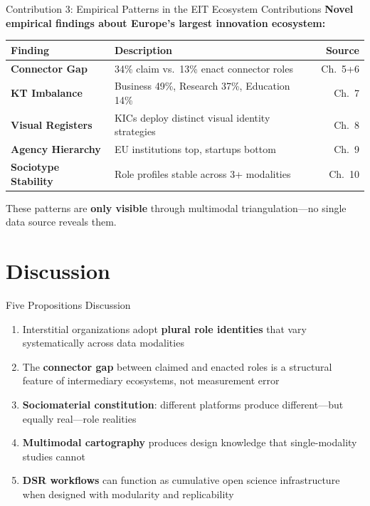 \documentclass[aspectratio=169]{beamer}
\newcommand{\secmark}[1]{\hfill{\scriptsize\color{gray}#1}}
\begin{document}
\begin{frame}{Contribution 3: Empirical Patterns in the EIT Ecosystem}
\secmark{Contributions}
\textbf{Novel empirical findings about Europe's largest innovation ecosystem:}
\vspace{0.5em}
\renewcommand{\arraystretch}{1.3}
\begin{tabularx}{\textwidth}{@{}>{\bfseries}l X >{\small}r@{}}
\toprule
\textbf{Finding} & \textbf{Description} & \textbf{Source} \\
\midrule
Connector Gap  & 34\% claim vs.\ 13\% enact connector roles & Ch.~5+6 \\
KT Imbalance   & Business 49\%, Research 37\%, Education 14\% & Ch.~7 \\
Visual Registers & KICs deploy distinct visual identity strategies & Ch.~8 \\
Agency Hierarchy & EU institutions top, startups bottom & Ch.~9 \\
Sociotype Stability & Role profiles stable across 3+ modalities & Ch.~10 \\
\bottomrule
\end{tabularx}
\vspace{0.5em}
{\small These patterns are \textbf{only visible} through multimodal triangulation---no single data source reveals them.}
\end{frame}

\section{Discussion}

\begin{frame}{Five Propositions}
\secmark{Discussion}
\begin{enumerate}
    \item[\textbf{P1}] Interstitial organizations adopt \textbf{plural role identities} that vary systematically across data modalities
    \vspace{0.4em}
    \item[\textbf{P2}] The \textbf{connector gap} between claimed and enacted roles is a structural feature of intermediary ecosystems, not measurement error
    \vspace{0.4em}
    \item[\textbf{P3}] \textbf{Sociomaterial constitution}: different platforms produce different---but equally real---role realities
    \vspace{0.4em}
    \item[\textbf{P4}] \textbf{Multimodal cartography} produces design knowledge that single-modality studies cannot
    \vspace{0.4em}
    \item[\textbf{P5}] \textbf{DSR workflows} can function as cumulative open science infrastructure when designed with modularity and replicability
\end{enumerate}
\end{frame}
\end{document}

